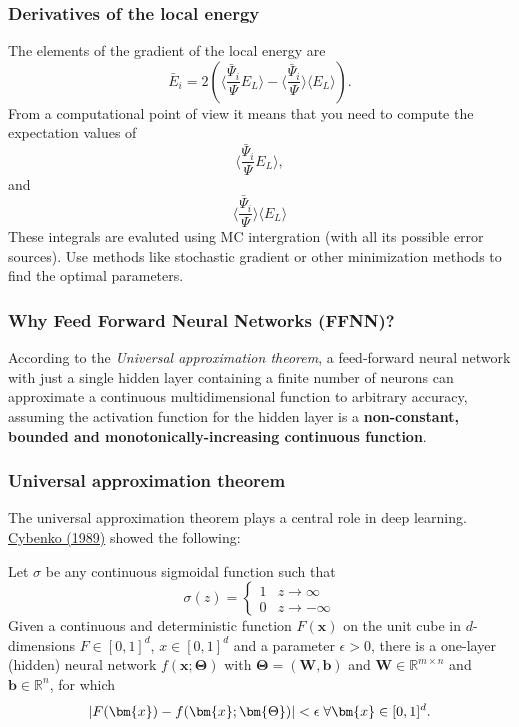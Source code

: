 \documentclass{beamer}
\begin{document}
\begin{frame}
\frametitle{Derivatives of the local energy}

\begin{block}{}
The elements of the gradient of the local energy are 
\[
\bar{E}_{i}= 2\left( \langle \frac{\bar{\Psi}_{i}}{\Psi}E_L\rangle -\langle \frac{\bar{\Psi}_{i}}{\Psi}\rangle\langle E_L \rangle\right).
\]
From a computational point of view it means that you need to compute the expectation values of 
\[
\langle \frac{\bar{\Psi}_{i}}{\Psi}E_L\rangle,
\]
and
\[
\langle \frac{\bar{\Psi}_{i}}{\Psi}\rangle\langle E_L\rangle
\]
These integrals are evaluted using MC intergration (with all its possible error sources). Use methods like stochastic gradient or other minimization methods to find the optimal parameters.
\end{block}
\end{frame}

\begin{frame}
\frametitle{Why Feed Forward Neural Networks (FFNN)?}

According to the \emph{Universal approximation theorem}, a feed-forward
neural network with just a single hidden layer containing a finite
number of neurons can approximate a continuous multidimensional
function to arbitrary accuracy, assuming the activation function for
the hidden layer is a \textbf{non-constant, bounded and
monotonically-increasing continuous function}.
\end{frame}

\begin{frame}
\frametitle{Universal approximation theorem}

The universal approximation theorem plays a central role in deep
learning.  \href{{https://link.springer.com/article/10.1007/BF02551274}}{Cybenko (1989)} showed
the following:

\begin{block}{}
Let $\sigma$ be any continuous sigmoidal function such that
\[
\sigma(z) = \left\{\begin{array}{cc} 1 & z\rightarrow \infty\\ 0 & z \rightarrow -\infty \end{array}\right.
\]
Given a continuous and deterministic function $F(\bm{x})$ on the unit
cube in $d$-dimensions $F\in [0,1]^d$, $x\in [0,1]^d$ and a parameter
$\epsilon >0$, there is a one-layer (hidden) neural network
$f(\bm{x};\bm{\Theta})$ with $\bm{\Theta}=(\bm{W},\bm{b})$ and $\bm{W}\in
\mathbb{R}^{m\times n}$ and $\bm{b}\in \mathbb{R}^{n}$, for which
\[
\vert F(\bm{x})-f(\bm{x};\bm{\Theta})\vert < \epsilon \hspace{0.1cm} \forall \bm{x}\in[0,1]^d.
\]

\end{block}
\end{frame}
\end{document}
